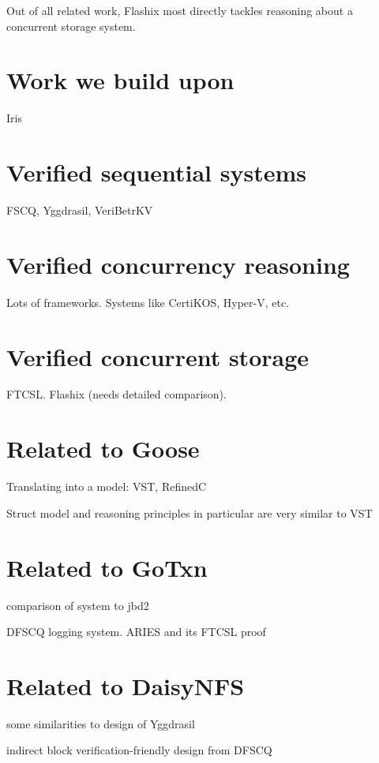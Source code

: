Out of all related work, Flashix most directly tackles reasoning about a
concurrent storage system.

\section{Work we build upon}%

Iris

\section{Verified sequential systems}

FSCQ, Yggdrasil, VeriBetrKV

\section{Verified concurrency reasoning}

Lots of frameworks. Systems like CertiKOS, Hyper-V, etc.

\section{Verified concurrent
storage}

FTCSL. Flashix (needs detailed comparison).

\section{Related to Goose}

Translating into a model: VST, RefinedC

Struct model and reasoning principles in particular are very similar to
VST

\section{Related to GoTxn}

comparison of system to jbd2

DFSCQ logging system. ARIES and its FTCSL proof

\section{Related to DaisyNFS}

some similarities to design of Yggdrasil

indirect block verification-friendly design from DFSCQ
